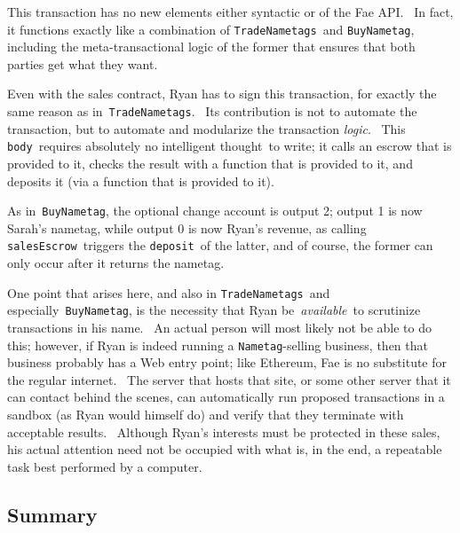 \documentclass[11pt]{article}
\begin{document}
This transaction has no new elements either syntactic or of the Fae API.  In fact, it functions exactly like a combination of \texttt{TradeNametags} and \texttt{BuyNametag}, including the meta-transactional logic of the former that ensures that both parties get what they want.


\vspace{11pt}

Even with the sales contract, Ryan has to sign this transaction, for exactly the same reason as in \texttt{TradeNametags}.  Its contribution is not to automate the transaction, but to automate and modularize the transaction \textit{logic}.  This \texttt{body} requires absolutely no intelligent thought to write; it calls an escrow that is provided to it, checks the result with a function that is provided to it, and deposits it (via a function that is provided to it).


\vspace{11pt}

As in \texttt{BuyNametag}, the optional change account is output 2; output 1 is now Sarah's nametag, while output 0 is now Ryan's revenue, as calling \texttt{salesEscrow} triggers the \texttt{deposit} of the latter, and of course, the former can only occur after it returns the nametag.


\vspace{11pt}

One point that arises here, and also in \texttt{TradeNametags} and especially \texttt{BuyNametag}, is the necessity that Ryan be \textit{available} to scrutinize transactions in his name.  An actual person will most likely not be able to do this; however, if Ryan is indeed running a \texttt{Nametag}-selling business, then that business probably has a Web entry point; like Ethereum, Fae is no substitute for the regular internet.  The server that hosts that site, or some other server that it can contact behind the scenes, can automatically run proposed transactions in a sandbox (as Ryan would himself do) and verify that they terminate with acceptable results.  Although Ryan's interests must be protected in these sales, his actual attention need not be occupied with what is, in the end, a repeatable task best performed by a computer.

\subsection{Summary}
\vspace{5.5pt}
\end{document}
